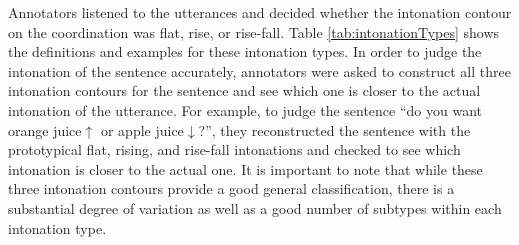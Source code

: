 \documentclass[oneside]{report}
\theoremstyle{definition}
\theoremstyle{definition}
\theoremstyle{definition}
\theoremstyle{remark}
\begin{document}
Annotators listened to the utterances and decided whether the intonation
contour on the coordination was flat, rise, or rise-fall. Table
\ref{tab:intonationTypes} shows the definitions and examples for these
intonation types. In order to judge the intonation of the sentence
accurately, annotators were asked to construct all three intonation
contours for the sentence and see which one is closer to the actual
intonation of the utterance. For example, to judge the sentence ``do you
want orange juice\(\uparrow\) or apple juice\(\downarrow\)?'', they
reconstructed the sentence with the prototypical flat, rising, and
rise-fall intonations and checked to see which intonation is closer to
the actual one. It is important to note that while these three
intonation contours provide a good general classification, there is a
substantial degree of variation as well as a good number of subtypes
within each intonation type.
\end{document}
